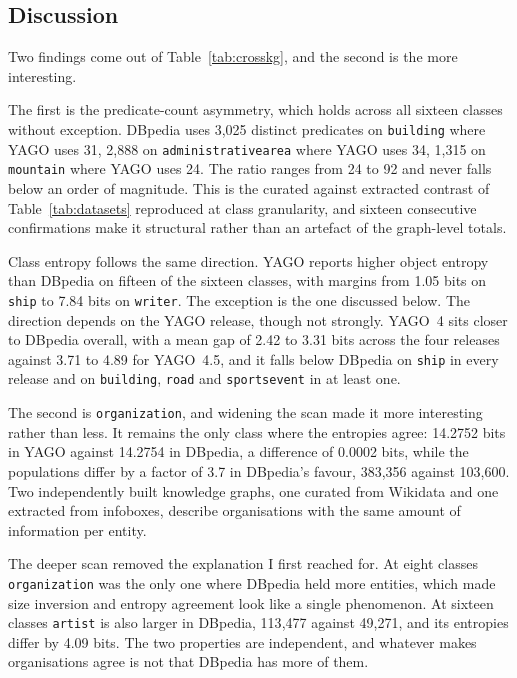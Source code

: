 \subsection{Discussion}

Two findings come out of Table~\ref{tab:crosskg}, and the second is the more
interesting.

The first is the predicate-count asymmetry, which holds across all sixteen
classes without exception. DBpedia uses 3{,}025 distinct predicates on
\texttt{building} where YAGO uses 31, 2{,}888 on \texttt{administrativearea}
where YAGO uses 34, 1{,}315 on \texttt{mountain} where YAGO uses 24. The ratio
ranges from 24 to 92 and never falls below an order of magnitude. This is the
curated against extracted contrast of Table~\ref{tab:datasets} reproduced at
class granularity, and sixteen consecutive confirmations make it structural
rather than an artefact of the graph-level totals.

Class entropy follows the same direction. YAGO reports higher object entropy than
DBpedia on fifteen of the sixteen classes, with margins from 1.05 bits on
\texttt{ship} to 7.84 bits on \texttt{writer}. The exception is the one
discussed below. The direction depends on the YAGO release, though not
strongly. YAGO~4 sits closer to DBpedia overall, with a mean gap of 2.42 to 3.31
bits across the four releases against 3.71 to 4.89 for YAGO~4.5, and it falls
below DBpedia on \texttt{ship} in every release and on \texttt{building},
\texttt{road} and \texttt{sportsevent} in at least one.

The second is \texttt{organization}, and widening the scan made it more
interesting rather than less. It remains the only class where the entropies
agree: 14.2752 bits in YAGO against 14.2754 in DBpedia, a difference of 0.0002
bits, while the populations differ by a factor of 3.7 in DBpedia's favour,
383{,}356 against 103{,}600. Two independently built knowledge graphs, one
curated from Wikidata and one extracted from infoboxes, describe organisations
with the same amount of information per entity.

The deeper scan removed the explanation I first reached for. At eight classes
\texttt{organization} was the only one where DBpedia held more entities, which
made size inversion and entropy agreement look like a single phenomenon. At
sixteen classes \texttt{artist} is also larger in DBpedia, 113{,}477 against
49{,}271, and its entropies differ by 4.09 bits. The two properties are
independent, and whatever makes organisations agree is not that DBpedia has more
of them.

